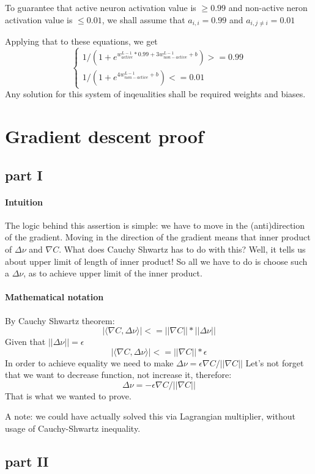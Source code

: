 \documentclass{article}
\begin{document}
To guarantee that active neuron activation value is $\geq 0.99$ and non-active neron activation value is $\leq 0.01$, we shall assume that $a_{i,i} = 0.99$ and $a_{i,j \neq i} = 0.01$

Applying that to these equations, we get
\[
\begin{cases}
1/(1 + e^{w_{active}^{L-1} * 0.99 + 3w_{non-active}^{L-1} + b}) >= 0.99\\
1/(1 + e^{4w_{non-active}^{L-1} + b}) <= 0.01
\end{cases}
\]
Any solution for this system of inqeualities shall be required weights and biases. 

\section{Gradient descent proof}
\subsection{part I}
\paragraph{Intuition}
The logic behind this assertion is simple: we have to move in the (anti)direction of the gradient.
Moving in the direction of the gradient means that inner product of ${\Delta}\nu$ and ${\nabla}C$.
What does Cauchy Shwartz has to do with this? 
Well, it tells us about  upper limit of length of inner product! 
So all we have to do is choose such a ${\Delta}\nu$, as to achieve upper limit of the inner product.
\paragraph{Mathematical notation}
By Cauchy Shwartz theorem:
$$|{\langle}{\nabla}C,{\Delta}\nu{\rangle}| <= ||{\nabla}C||*||{\Delta}\nu||$$
Given that $||{\Delta}\nu|| = \epsilon$
$$|{\langle}{\nabla}C,{\Delta}\nu{\rangle}| <= ||{\nabla}C||*\epsilon$$
In order to achieve equality we need to make ${\Delta}\nu = {\epsilon}{\nabla}C/||{\nabla}C||$
Let's not forget that we want to decrease function, not increase it, therefore:
$${\Delta}\nu = -{\epsilon}{\nabla}C/||{\nabla}C||$$
That is what we wanted to prove.

A note: we could have actually solved this via Lagrangian multiplier, without usage of Cauchy-Shwartz inequality.

\subsection{part II}
\end{document}
